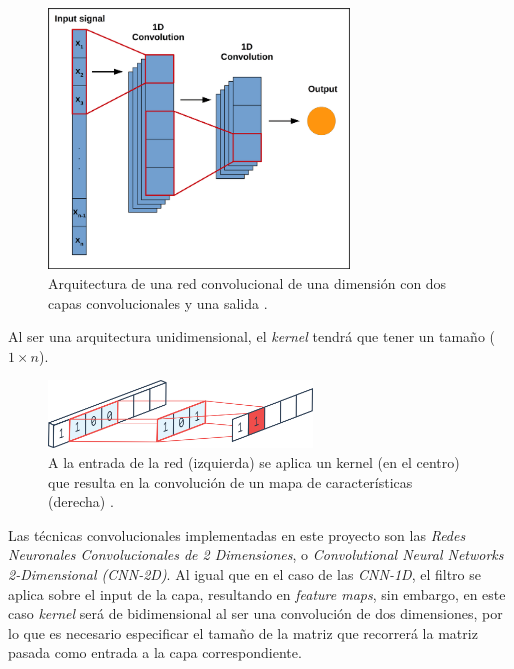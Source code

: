                 \begin{figure}[h]
                    \centering
                    \includegraphics[width=8cm]{archivos/3.Tecnologias/RedesNeuronales/CNN/1D/1CNNArchImage}
                    \captionsetup{width=.7\textwidth}
                    \caption{Arquitectura de una red convolucional de una dimensión con dos capas convolucionales y una salida \cite{CNN1DArchitectureImage}.}
                    \label{1CNNArchImage}
                \end{figure}


                Al ser una arquitectura unidimensional, el \textit{kernel} tendrá que tener un tamaño ($1 \times n$).

                \begin{figure}[h]
                    \centering
                    \includegraphics[width=7cm]{archivos/3.Tecnologias/RedesNeuronales/CNN/1D/1DConvolution}
                    \captionsetup{width=.75\textwidth}
                    \caption{A la entrada de la red (izquierda) se aplica un kernel (en el centro) que resulta en la convolución de un mapa de características (derecha) \cite{CNN1DImage}.}
                    \label{1DConvolutionImage}
                \end{figure}

                    
                Las técnicas convolucionales implementadas en este proyecto son las \textit{Redes Neuronales Convolucionales de 2 Dimensiones}, o \textit{Convolutional Neural Networks 2-Dimensional (CNN-2D)}. Al igual que en el caso de las \textit{CNN-1D}, el filtro se aplica sobre el input de la capa, resultando en \textit{feature maps}, sin embargo, en este caso \textit{kernel} será de bidimensional al ser una convolución de dos dimensiones, por lo que es necesario especificar el tamaño de la matriz que recorrerá la matriz pasada como entrada a la capa correspondiente.

